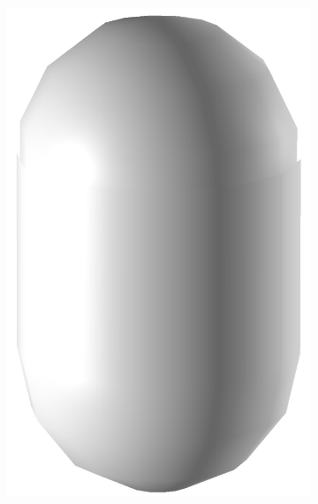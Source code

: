 \begin{figure}
\begin{center}
\begin{subfigure}{0.24\textwidth}
    \includegraphics[width=\linewidth]{assets/images/shapes/bugold/bad_mesh_med}
    \caption{}
    \end{subfigure}
    \begin{subfigure}{0.24\textwidth}

\end{subfigure}
\end{center}
\end{figure}
